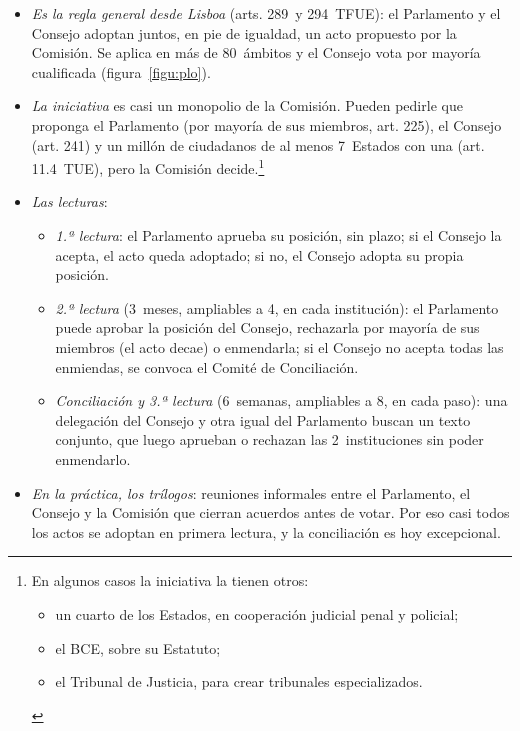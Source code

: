 \documentclass[11pt]{article}
\begin{document}
\begin{itemize}
\item \emph{Es la regla general desde Lisboa} (arts. 289~y 294~TFUE): el Parlamento y el Consejo adoptan juntos, en pie de igualdad, un acto propuesto por la Comisión. Se aplica en más de 80~ámbitos y el Consejo vota por mayoría cualificada (figura~\ref{figu:plo}).
\item \emph{La iniciativa} es casi un monopolio de la Comisión. Pueden pedirle que proponga el Parlamento (por mayoría de sus miembros, art. 225), el Consejo (art. 241) y un millón de ciudadanos de al menos 7~Estados con una  (art. 11.4~TUE), pero la Comisión decide.\footnote{En algunos casos la iniciativa la tienen otros:
\begin{itemize}
\item un cuarto de los Estados, en cooperación judicial penal y policial;
\item el BCE, sobre su Estatuto;
\item el Tribunal de Justicia, para crear tribunales especializados.
\end{itemize}}
\item \emph{Las lecturas}:
  \begin{itemize}
  \item \emph{1.ª lectura}: el Parlamento aprueba su posición, sin plazo; si el Consejo la acepta, el acto queda adoptado; si no, el Consejo adopta su propia posición.
  \item \emph{2.ª lectura} (3~meses, ampliables a 4, en cada institución): el Parlamento puede aprobar la posición del Consejo, rechazarla por mayoría de sus miembros (el acto decae) o enmendarla; si el Consejo no acepta todas las enmiendas, se convoca el Comité de Conciliación.
  \item \emph{Conciliación y 3.ª lectura} (6~semanas, ampliables a 8, en cada paso): una delegación del Consejo y otra igual del Parlamento buscan un texto conjunto, que luego aprueban o rechazan las 2~instituciones sin poder enmendarlo.
  \end{itemize}
\item \emph{En la práctica, los trílogos}: reuniones informales entre el Parlamento, el Consejo y la Comisión que cierran acuerdos antes de votar. Por eso casi todos los actos se adoptan en primera lectura, y la conciliación es hoy excepcional.
\end{itemize}

\begin{infografia}[H]
\centering
\caption{El procedimiento legislativo ordinario (art. 294~TFUE)}\label{figu:plo}
\end{infografia}
\end{document}

